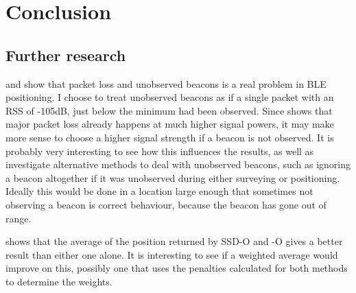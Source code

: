 \chapter{Conclusion}

\section{Further research}
 and  show that packet loss and unobserved beacons is a real problem in BLE positioning.
I choose to treat unobserved beacons as if a single packet with an RSS of -105dB, just below the minimum had been observed.
Since  shows that major packet loss already happens at much higher signal powers, it may make more sense to choose a higher signal strength if a beacon is not observed.
It is probably very interesting to see how this influences the results, as well as investigate alternative methods to deal with unobserved beacons, such as ignoring a beacon altogether if it was unobserved during either surveying or positioning.
Ideally this would be done in a location large enough that sometimes not observing a beacon is correct behaviour, because the beacon has gone out of range.

 shows that the average of the position returned by SSD-O and \aBRP-O gives a better result than either one alone.
It is interesting to see if a weighted average would improve on this, possibly one that uses the penalties calculated for both methods to determine the weights.
